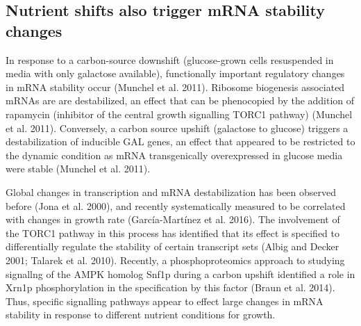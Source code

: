 \subsection{Nutrient shifts also trigger mRNA stability changes }

In response to a carbon-source downshift
(glucose-grown cells resuspended in media with only galactose
available), functionally important regulatory changes in mRNA
stability occur (Munchel et al. 2011). Ribosome biogenesis associated
mRNAs are are destabilized, an effect that can be phenocopied by the
addition of rapamycin (inhibitor of the central growth signalling
TORC1 pathway) (Munchel et al. 2011). Conversely, a carbon source
upshift (galactose to glucose) triggers a destabilization of inducible
GAL genes, an effect that appeared to be restricted to the dynamic
condition as mRNA transgenically overexpressed in glucose media were
stable (Munchel et al. 2011).  

Global changes in transcription and
mRNA destabilization has been observed before (Jona et al. 2000), and
recently systematically measured to be correlated with changes in
growth rate (García-Martínez et al. 2016). The involvement of the
TORC1 pathway in this process has identified that its effect is
specified to differentially regulate the stability of certain
transcript sets (Albig and Decker 2001; Talarek et al. 2010).
Recently, a phosphoproteomics approach to studying signallng of the
AMPK homolog Snf1p during a carbon upshift identified a role in Xrn1p
phosphorylation in the specification by this factor (Braun et al.
2014). Thus, specific signalling pathways appear to effect large
changes in mRNA stability in response to different nutrient conditions
for growth. 

